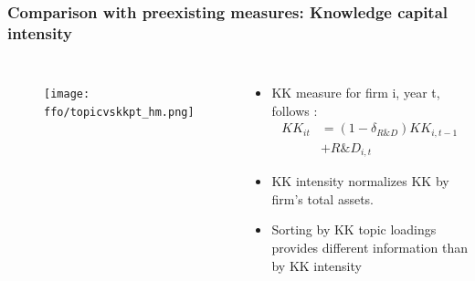 \documentclass{beamer}
\newcommand{\ffo}{dicfullmc10thr10defnob40noa1_4t}
\newcommand{\insertfigure}[2]{
\begin{figure}[h!]
  \centering
  \texttt{[image: \\ffo/\#1]}
  \centering
  \captionsetup{font=scriptsize}
  \caption{#2}
  \label{fig:#1}
\end{figure}
}
\begin{document}


\begin{frame}
\frametitle{Comparison with preexisting measures: Knowledge capital intensity}
\scriptsize
\begin{columns}
\begin{figure}[h!]
\centering
\texttt{[image: \\ffo/topicvskkpt\_hm.png]}
\label{fig:topicvskkpt_hm}
\end{figure}
\begin{itemize}
	\item KK measure for firm i, year t, follows \cite{Peters2017-fl}:
	\begin{align*}
		KK_{it} &= (1-\delta_{R\&D}) KK_{i,t-1}\\
		&+R\&D_{i,t}
	\end{align*}
	\item KK intensity normalizes KK by firm's total assets.
	\item Sorting by KK topic loadings provides different information than by KK intensity
\end{itemize}
\end{columns}
\end{frame}
\end{document}
